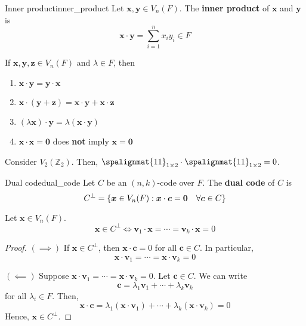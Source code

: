 \begin{Definition}{Inner product}{inner_product}
    Let $ \bm{x},\bm{y}\in V_n(F) $. The \textbf{inner product}
    of $ \bm{x} $ and $ \bm{y} $ is
    \[ \bm{x}\cdot \bm{y}=\sum\limits_{i=1}^{n} x_i y_i\in F \]
\end{Definition}

\begin{Theorem}{}{}
    If $ \bm{x},\bm{y},\bm{z}\in V_n(F) $ and $ \lambda\in F $, then
    \begin{enumerate}[label=(\arabic*)]
        \item $ \bm{x}\cdot \bm{y}=\bm{y}\cdot \bm{x} $
        \item $ \bm{x}\cdot (\bm{y}+\bm{z})=\bm{x}\cdot \bm{y}+\bm{x}\cdot \bm{z} $
        \item $ (\lambda \bm{x})\cdot \bm{y}=\lambda(\bm{x}\cdot \bm{y}) $
        \item $ \bm{x}\cdot \bm{x}=\bm{0}$ does \textbf{not} imply $ \bm{x}=\bm{0} $
    \end{enumerate}
\end{Theorem}

\begin{Example}{}{}
    Consider $ V_2(\mathbb{Z}_2) $. Then,
    $ \spalignmat{1 1}_{1\times 2}\cdot\spalignmat{1 1}_{1\times 2}=0 $.
\end{Example}

\begin{Definition}{Dual code}{dual_code}
    Let $ C $ be an $ (n,k) $-code over $ F $. The \textbf{dual code}
    of $ C $ is
    \[ C^{\perp}=\{\bm{x}\in V_n(F):\bm{x}\cdot \bm{c}=\bm{0}\quad\forall \bm{c}\in C\} \]
\end{Definition}

\begin{Theorem}{}{}
    Let $ \bm{x}\in V_n(F) $.
    \[ \bm{x}\in C^{\perp}\iff \bm{v}_1\cdot \bm{x}=\cdots =\bm{v}_k\cdot \bm{x}=0 \]
\end{Theorem}

\begin{proof}
    $ (\implies) $ If $ \bm{x}\in C^{\perp} $, then $ \bm{x}\cdot \bm{c}=0 $ for all
    $ \bm{c}\in C $. In particular,
    \[ \bm{x}\cdot \bm{v}_1=\cdots =\bm{x}\cdot \bm{v}_k=0 \]

    $ (\impliedby) $ Suppose $ \bm{x}\cdot \bm{v}_1=\cdots =\bm{x}\cdot \bm{v}_k=0 $. Let $ \bm{c}\in C $.
    We can write
    \[ \bm{c}=\lambda_1\bm{v}_1+\cdots+\lambda_k\bm{v}_k \]
    for all $ \lambda_i\in F $. Then,
    \[ \bm{x}\cdot \bm{c}=\lambda_1(\bm{x}\cdot \bm{v}_1)+\cdots+\lambda_k(\bm{x}\cdot \bm{v}_k)=0 \]
    Hence, $ \bm{x}\in C^{\perp} $.
\end{proof}

